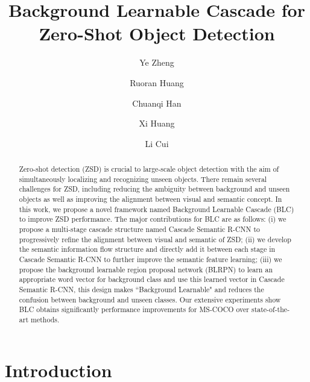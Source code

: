 \documentclass[runningheads]{llncs}
\begin{document}
\pagestyle{headings}
\mainmatter

\def\ACCV20SubNumber{360}  

\title{Background Learnable Cascade for Zero-Shot Object Detection} 
\author{Ye Zheng \and
Ruoran Huang \and
Chuanqi Han \and Xi Huang \and Li Cui}


\maketitle

\begin{abstract}
Zero-shot detection (ZSD) is crucial to large-scale object detection with the aim of simultaneously localizing and recognizing unseen objects. There remain several challenges for ZSD, including reducing the ambiguity between background and unseen objects as well as improving the alignment between visual and semantic concept. In this work, we propose a novel framework named Background Learnable Cascade (BLC) to improve ZSD performance. The major contributions for BLC are as follows: (i) we propose a multi-stage cascade structure named Cascade Semantic R-CNN to progressively refine the alignment between visual and semantic of ZSD; (ii) we develop the semantic information flow structure and directly add it between each stage in Cascade Semantic R-CNN to further improve the semantic feature learning; (iii) we propose the background learnable region proposal network (BLRPN) to learn an appropriate word vector for background class and use this learned vector in Cascade Semantic R-CNN, this design makes ``Background Learnable" and reduces the confusion between background and unseen classes. Our extensive experiments show BLC obtains significantly performance improvements for MS-COCO over state-of-the-art methods. 

\end{abstract}

\section{Introduction}
\end{document}
